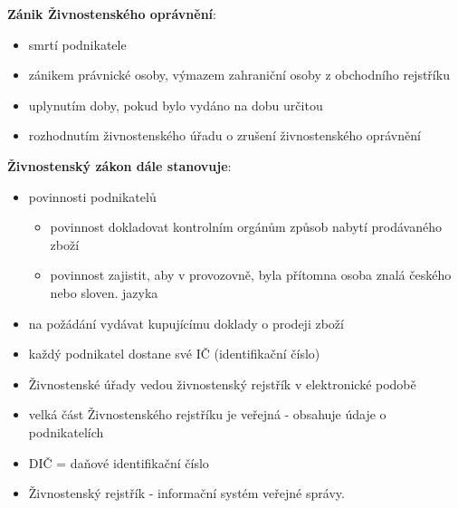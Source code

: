 \textbf{Zánik Živnostenského oprávnění}:
\begin{itemize}
    \item smrtí podnikatele
    \item zánikem právnické osoby, výmazem zahraniční osoby z obchodního rejstříku
    \item uplynutím doby, pokud bylo vydáno na dobu určitou
    \item rozhodnutím živnostenského úřadu o zrušení živnostenského oprávnění
\end{itemize}

\textbf{Živnostenský zákon dále stanovuje}:
\begin{itemize}
    \item povinnosti podnikatelů	
        \begin{itemize}
            \item povinnost dokladovat kontrolním orgánům způsob nabytí prodávaného zboží
            \item povinnost zajistit, aby v provozovně, byla přítomna osoba znalá českého nebo sloven. jazyka
        \end{itemize}
    \item na požádání vydávat kupujícímu doklady o prodeji zboží
    \item každý podnikatel dostane své IČ (identifikační číslo)
    \item Živnostenské úřady vedou živnostenský rejstřík v elektronické podobě
    \item velká část Živnostenského rejstříku je veřejná - obsahuje údaje o podnikatelích
    \item DIČ = daňové identifikační číslo
    \item Živnostenský rejstřík - informační systém veřejné správy.
\end{itemize}

